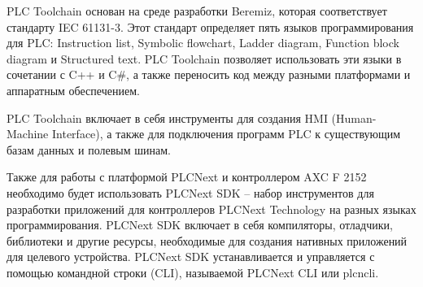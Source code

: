 {	\par \redline PLC Toolchain основан на среде разработки Beremiz, которая соответствует стандарту IEC 61131-3. Этот стандарт определяет пять языков программирования для PLC: Instruction list, Symbolic flowchart, Ladder diagram, Function block diagram и Structured text. PLC Toolchain позволяет использовать эти языки в сочетании с C++ и C\#, а также переносить код между разными платформами и аппаратным обеспечением.
	
	\par \redline PLC Toolchain включает в себя инструменты для создания HMI (Human-Machine Interface), а также для подключения программ PLC к существующим базам данных и полевым шинам. 

	\par \redline Также для работы с платформой PLCNext и контроллером AXC F 2152 необходимо будет использовать PLCNext SDK – набор инструментов для разработки приложений для контроллеров PLCNext Technology на разных языках программирования. PLCNext SDK включает в себя компиляторы, отладчики, библиотеки и другие ресурсы, необходимые для создания нативных приложений для целевого устройства. PLCNext SDK устанавливается и управляется с помощью командной строки (CLI), называемой PLCNext CLI или plcncli.
	
	
	
	\par
}


\setcounter{subchaptercntr}{1}
\setcounter{formulacntr}{1}
\setcounter{imagecntr}{1}
\setcounter{tablecntr}{1}
\setcounter{itemcntr}{1}

